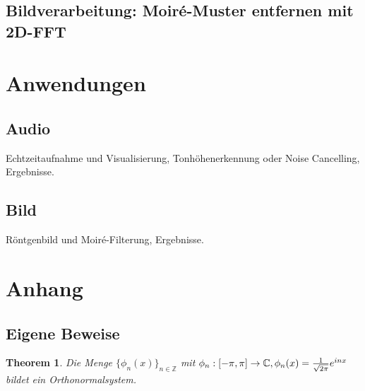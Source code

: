 \documentclass[a4paper,12pt]{article}
\newtheorem{theorem}{Theorem}[section]
\theoremstyle{definition}
\theoremstyle{remark}
\begin{document}
        \subsection{Bildverarbeitung: Moiré-Muster entfernen mit 2D-FFT}
        
        \section{Anwendungen}
        \subsection{Audio}
        Echtzeitaufnahme und Visualisierung, Tonhöhenerkennung oder Noise Cancelling, Ergebnisse.
        \subsection{Bild}
        Röntgenbild und Moiré-Filterung, Ergebnisse.
        
\section{Anhang}

\subsection{Eigene Beweise}
    \begin{theorem}\label{thm:orthonorm}
        Die Menge $\{\phi_n(x)\}_{n\in\mathbb{Z}}$ mit $\phi_n:[-\pi, \pi] \to \mathbb{C}, \\ \phi_n(x) = \frac{1}{\sqrt{2\pi}}e^{inx}$ bildet ein Orthonormalsystem.
    \end{theorem}
        
\end{document}
